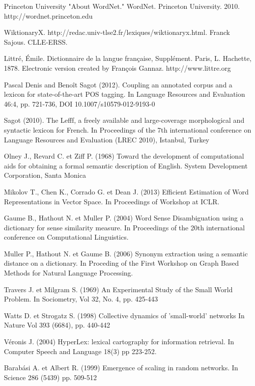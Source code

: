 \begin{thebibliography}{10}

Princeton University "About WordNet." WordNet. Princeton 
University. 2010. http://wordnet.princeton.edu \label{bib:wordnet}

WiktionaryX. 
http://redac.univ-tlse2.fr/lexiques/wiktionaryx.html. 
Franck Sajous. CLLE-ERSS. \label{bib:wikixml}

Littré, Émile. Dictionnaire de la langue française, 
Supplément. Paris, L. Hachette, 1878. Electronic version created by François 
Gannaz. http://www.littre.org \label{bib:littrexml}

Pascal Denis and Benoît Sagot (2012). Coupling an annotated 
corpus and a lexicon for state-of-the-art POS tagging. In Language Resources 
and Evaluation 46:4, pp. 721-736, DOI 10.1007/s10579-012-9193-0\label{bib:melt} 

Sagot (2010). The Lefff, a freely available and large-coverage 
morphological and syntactic lexicon for French. In Proceedings of the 7th 
international conference on Language Resources and Evaluation (LREC 2010), 
Istanbul, Turkey\label{bib:lefff} 

Olney J., Revard C. et Ziff P. (1968) Toward the development
 of computational aids for obtaining a formal semantic description of English.
System Development Corporation, Santa Monica\label{bib:olnyetal} 


Mikolov T., Chen K., Corrado G. et Dean J. (2013)
Efficient Estimation of Word Representations in Vector Space. In
Proceedings of Workshop at ICLR.\label{bib:word2vec} 

Gaume B., Hathout N. et Muller P. (2004)
Word Sense Disambiguation using a dictionary for sense similarity measure.
In Proceedings of the 20th international conference on Computational
Linguistics.\label{bib:gaumeetal} 

Muller P., Hathout N. et Gaume B. (2006)
Synonym extraction using a semantic distance on a dictionary.
In Proceding of the First Workshop on Graph Based Methods for
Natural Language Processing.\label{bib:mulleretal} 

Travers J. et Milgram S. (1969)
An Experimental Study of the Small World Problem.
In Sociometry, Vol 32, No. 4, pp. 425-443\label{bib:traversmilgram} 

Watts D. et Strogatz S. (1998)
Collective dynamics of 'small-world' networks
In Nature Vol 393 (6684), pp. 440-442 \label{bib:wattsstrogatz} 

Véronis J. (2004)
HyperLex: lexical cartography for information retrieval.
In Computer Speech and Language 18(3) pp 223-252. \label{bib:veronis} 

Barabási A. et Albert R. (1999)
Emergence of scaling in random networks.
In Science 286 (5439) pp. 509-512 \label{bib:barabasi}

\end{thebibliography}
